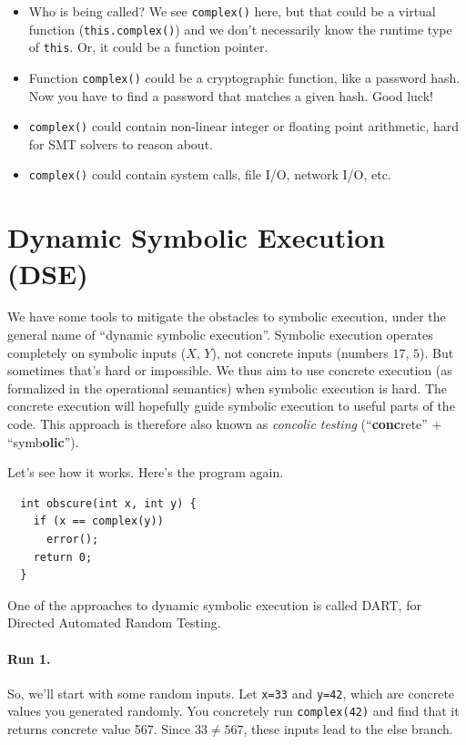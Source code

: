 \documentclass[11pt]{article}
\begin{document}
\begin{itemize}[noitemsep]
\item Who is being called? We see \texttt{complex()} here, but that could be
  a virtual function (\texttt{this.complex()}) and we don't necessarily know the
  runtime type of \texttt{this}. Or, it could be a function pointer.
\item Function \texttt{complex()} could be a cryptographic function, like a password hash.
  Now you have to find a password that matches a given hash. Good luck!
\item \texttt{complex()} could contain non-linear integer or floating point arithmetic,
  hard for SMT solvers to reason about.
\item \texttt{complex()} could contain system calls, file I/O, network I/O, etc.
\end{itemize}

\section*{Dynamic Symbolic Execution (DSE)}
We have some tools to mitigate the obstacles to symbolic execution,
under the general name of ``dynamic symbolic execution''.  Symbolic
execution operates completely on symbolic inputs ($X$, $Y$), not
concrete inputs (numbers $17$, $5$).  But sometimes that's hard or
impossible. We thus aim to use concrete execution (as formalized in
the operational semantics) when symbolic execution is hard. The
concrete execution will hopefully guide symbolic execution to useful
parts of the code. This approach is therefore also known as 
\emph{concolic testing} (``\textbf{conc}rete'' +
``symb\textbf{olic}'').

Let's see how it works. Here's the program again.

\begin{lstlisting}
  int obscure(int x, int y) {
    if (x == complex(y))
      error();
    return 0;
  }
\end{lstlisting}
One of the approaches to dynamic symbolic execution is called DART,
for Directed Automated Random Testing. 

\paragraph{Run 1.} So, we'll start with some random inputs.
Let \texttt{x=33} and \texttt{y=42}, which are concrete values you
generated randomly. You concretely run \texttt{complex(42)} and find
that it returns concrete value 567. Since $33 \neq 567$, these inputs lead to the else
branch.
\end{document}
